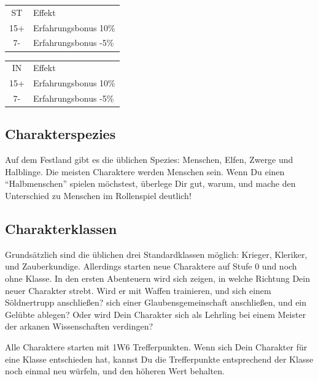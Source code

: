 \documentclass[11pt]{wbzine}
\begin{document}
\begin{multicols}{2}
\begin{tabularx}{\columnwidth}{cZ}
    ST & Effekt \\
    15+ & Erfahrungsbonus 10\% \\
    7- & Erfahrungsbonus -5\% \\
\end{tabularx}

\begin{tabularx}{\columnwidth}{cZ}
    IN & Effekt \\
    15+ & Erfahrungsbonus 10\% \\
    7- & Erfahrungsbonus -5\% \\
\end{tabularx}

\subsection{Charakterspezies}

Auf dem Festland gibt es die üblichen Spezies: Menschen, Elfen,
Zwerge und Halblinge. Die meisten Charaktere werden Menschen sein.
Wenn Du einen ``Halbmenschen'' spielen möchstest, überlege Dir gut,
warum, und mache den Unterschied zu Menschen im Rollenspiel
deutlich!

\subsection{Charakterklassen}

Grundsätzlich sind die üblichen drei Standardklassen möglich:
Krieger, Kleriker, und Zauberkundige. Allerdings starten neue
Charaktere auf Stufe 0 und noch ohne Klasse. In den ersten
Abenteuern wird sich zeigen, in welche Richtung Dein neuer Charakter
strebt. Wird er mit Waffen trainieren, und sich einem Söldnertrupp
anschließen? sich einer Glaubensgemeinschaft anschließen, und ein
Gelübte ablegen? Oder wird Dein Charakter sich als Lehrling bei
einem Meister der arkanen Wissenschaften verdingen?

Alle Charaktere starten mit 1W6 Trefferpunkten. Wenn sich Dein
Charakter für eine Klasse entschieden hat, kannst Du die
Trefferpunkte entsprechend der Klasse noch einmal neu würfeln, und
den höheren Wert behalten.

\end{multicols}
\end{document}
